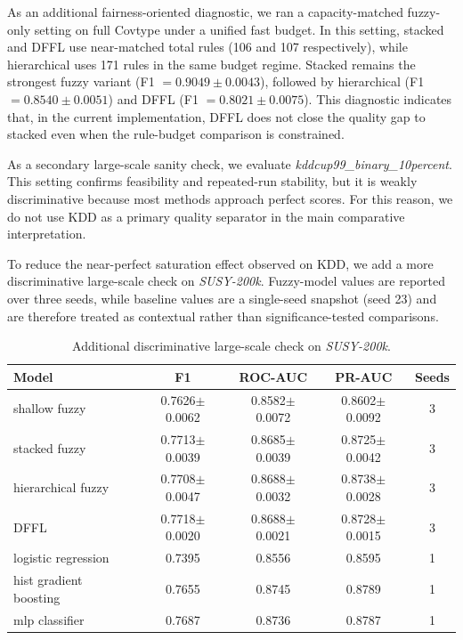 \documentclass[runningheads]{llncs}
\begin{document}
As an additional fairness-oriented diagnostic, we ran a capacity-matched fuzzy-only setting on full Covtype under a unified fast budget. In this setting, stacked and DFFL use near-matched total rules (106 and 107 respectively), while hierarchical uses 171 rules in the same budget regime. Stacked remains the strongest fuzzy variant (F1 $=0.9049\pm0.0043$), followed by hierarchical (F1 $=0.8540\pm0.0051$) and DFFL (F1 $=0.8021\pm0.0075$). This diagnostic indicates that, in the current implementation, DFFL does not close the quality gap to stacked even when the rule-budget comparison is constrained.

As a secondary large-scale sanity check, we evaluate \textit{kddcup99\_binary\_10percent}. This setting confirms feasibility and repeated-run stability, but it is weakly discriminative because most methods approach perfect scores. For this reason, we do not use KDD as a primary quality separator in the main comparative interpretation.

To reduce the near-perfect saturation effect observed on KDD, we add a more discriminative large-scale check on \textit{SUSY-200k}. Fuzzy-model values are reported over three seeds, while baseline values are a single-seed snapshot (seed 23) and are therefore treated as contextual rather than significance-tested comparisons.

\begin{table}[H]
\centering
\caption{Additional discriminative large-scale check on \textit{SUSY-200k}.}
\label{tab:susy_discriminative}
\scriptsize
\setlength{\tabcolsep}{4pt}
\begin{tabular}{lcccc}
\toprule
Model & F1 & ROC-AUC & PR-AUC & Seeds \\
\midrule
shallow fuzzy & 0.7626$\pm$0.0062 & 0.8582$\pm$0.0072 & 0.8602$\pm$0.0092 & 3 \\
stacked fuzzy & 0.7713$\pm$0.0039 & 0.8685$\pm$0.0039 & 0.8725$\pm$0.0042 & 3 \\
hierarchical fuzzy & 0.7708$\pm$0.0047 & 0.8688$\pm$0.0032 & 0.8738$\pm$0.0028 & 3 \\
DFFL & 0.7718$\pm$0.0020 & 0.8688$\pm$0.0021 & 0.8728$\pm$0.0015 & 3 \\
logistic regression & 0.7395 & 0.8556 & 0.8595 & 1 \\
hist gradient boosting & 0.7655 & 0.8745 & 0.8789 & 1 \\
mlp classifier & 0.7687 & 0.8736 & 0.8787 & 1 \\
\bottomrule
\end{tabular}
\end{table}
\end{document}
